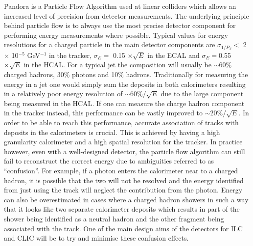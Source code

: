 Pandora\cite{Thomson200925} is a Particle Flow Algorithm used at linear colliders which allows an increased level of precision from detector measurements. The underlying principle behind particle flow is to always use the most precise detector component for performing energy measurements where possible. Typical values for energy resolutions for a charged particle in the main detector components are $\sigma_{1/P_T}<$ 2 $\times$ 10$^{-5}$ GeV$^{-1}$ in the tracker, $\sigma_E =$ 0.15 $\times \sqrt{E}$ in the \ac{ECAL} and $\sigma_E =$0.55 $\times \sqrt{E}$ in the \ac{HCAL}. For a typical jet the composition will usually be $\sim$60\% charged hadrons, 30\% photons and 10\% hadrons. Traditionally for measuring the energy in a jet one would simply sum the deposits in both calorimeters resulting in a relatively poor energy resolution of $\sim$60\%/$\sqrt{E}$ due to the large component being measured in the \ac{HCAL}. If one can measure the charge hadron component in the tracker instead, this performance can be vastly improved to $\sim$20\%/$\sqrt{E}$. In order to be able to reach this performance, accurate association of tracks with deposits in the calorimeters is crucial. This is achieved by having a high granularity calorimeter and a high spatial resolution for the tracker. In practice however, even with a well-designed detector, the particle flow algorithm can still fail to reconstruct the correct energy due to ambiguities referred to as ``confusion''. For example, if a photon enters the calorimeter near to a charged hadron, it is possible that the two will not be resolved and the energy identified from just using the track will neglect the contribution from the photon. Energy can also be overestimated in cases where a charged hadron showers in such a way that it looks like two separate calorimeter deposits which results in part of the shower being identified as a neutral hadron and the other fragment being associated with the track. One of the main design aims of the detectors for \ac{ILC} and \ac{CLIC} will be to try and minimise these confusion effects. 


